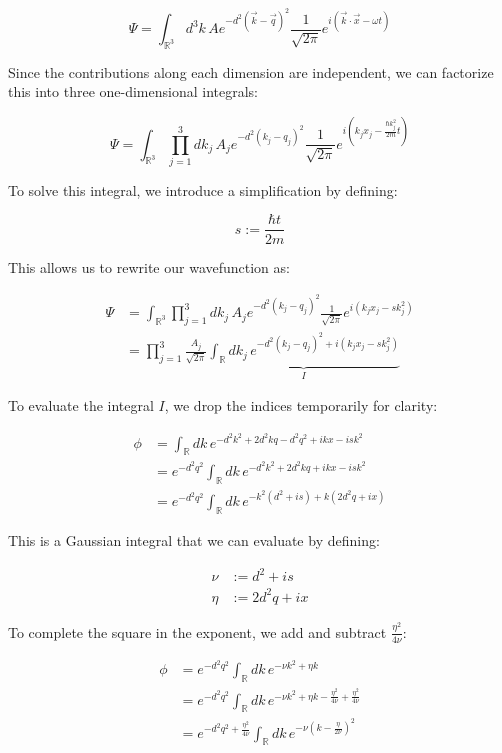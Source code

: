 \begin{equation}
\Psi = \int_{\mathbb{R}^3}d^3k\,Ae^{-d^2(\vec{k}-\vec{q})^2}\frac{1}{\sqrt{2\pi}}e^{i(\vec{k}\cdot\vec{x}-\omega t)}
\end{equation}

Since the contributions along each dimension are independent, we can factorize this into three one-dimensional integrals:

\begin{equation}
\Psi = \int_{\mathbb{R}^3}\prod_{j=1}^3 dk_j\,A_je^{-d^2(k_j-q_j)^2}\frac{1}{\sqrt{2\pi}}e^{i(k_jx_j-\frac{\hbar k_j^2}{2m}t)}
\end{equation}


To solve this integral, we introduce a simplification by defining:

\begin{equation}
s := \frac{\hbar t}{2m}
\end{equation}

This allows us to rewrite our wavefunction as:

\begin{align}
\Psi &= \int_{\mathbb{R}^3}\prod_{j=1}^3dk_j\,A_je^{-d^2(k_j-q_j)^2}\frac{1}{\sqrt{2\pi}}e^{i(k_jx_j-sk_j^2)} \\
&= \prod_{j=1}^3\frac{A_j}{\sqrt{2\pi}}\underbrace{\int_{\mathbb{R}}dk_j\,e^{-d^2(k_j-q_j)^2+i(k_jx_j-sk_j^2)}}_{I}
\end{align}

To evaluate the integral $I$, we drop the indices temporarily for clarity:

\begin{align}
\phi &= \int_{\mathbb{R}}dk\,e^{-d^2k^2+2d^2kq-d^2q^2+ikx-isk^2} \\
&= e^{-d^2q^2}\int_{\mathbb{R}}dk\,e^{-d^2k^2+2d^2kq+ikx-isk^2}  \\
&= e^{-d^2q^2}\int_{\mathbb{R}}dk\,e^{-k^2(d^2+is)+k(2d^2q+ix)}
\end{align}

This is a Gaussian integral that we can evaluate by defining:

\begin{align}
\nu &:= d^2+is \\
\eta &:= 2d^2q+ix
\end{align}

To complete the square in the exponent, we add and subtract $\frac{\eta^2}{4\nu}$:

\begin{align}
\phi &= e^{-d^2q^2}\int_{\mathbb{R}}dk\,e^{-\nu k^2+\eta k} \\
&= e^{-d^2q^2}\int_{\mathbb{R}}dk\,e^{-\nu k^2+\eta k-\frac{\eta^2}{4\nu}+\frac{\eta^2}{4\nu}}  \\
&= e^{-d^2q^2+\frac{\eta^2}{4\nu}}\int_{\mathbb{R}}dk\,e^{-\nu\left(k-\frac{\eta}{2\nu}\right)^2}
\end{align}

